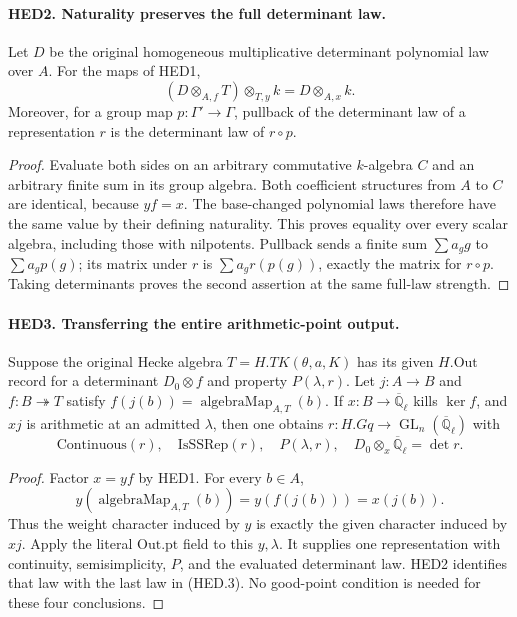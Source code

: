 \documentclass[11pt,a4paper]{article}
\numberwithin{equation}{section}
\theoremstyle{remark}\newtheorem{remark}[theorem]{Remark}
\begin{document}
\paragraph{HED2. Naturality preserves the full determinant law.}
\label{claim:HED2}
Let \(D\) be the original homogeneous multiplicative determinant
polynomial law over \(A\).  For the maps of HED1,
\[
                  (D\otimes_{A,f}T)\otimes_{T,y}k
                              =D\otimes_{A,x}k.
 \tag{HED.2}
\]
Moreover, for a group map \(p:\Gamma'\to\Gamma\), pullback of the
determinant law of a representation \(r\) is the determinant law of
\(r\circ p\).
\begin{proof}
Evaluate both sides on an arbitrary commutative \(k\)-algebra \(C\)
and an arbitrary finite sum in its group algebra.  Both coefficient
structures from \(A\) to \(C\) are identical, because \(yf=x\).
The base-changed polynomial laws therefore have the same value by
their defining naturality.  This proves equality over every scalar
algebra, including those with nilpotents.  Pullback sends a finite sum
\(\sum a_g g\) to \(\sum a_g p(g)\); its matrix under \(r\) is
\(\sum a_g r(p(g))\), exactly the matrix for \(r\circ p\).
Taking determinants proves the second assertion at the same full-law
strength.
\end{proof}

\paragraph{HED3. Transferring the entire arithmetic-point output.}
\label{claim:HED3}
Suppose the original Hecke algebra \(T=H.TK(\theta,a,K)\) has its
given \(H.\mathrm{Out}\) record for a determinant \(D_0\otimes f\)
and property \(P(\lambda,r)\).  Let \(j:A\to B\) and
\(f:B\twoheadrightarrow T\) satisfy
\(f(j(b))=\operatorname{algebraMap}_{A,T}(b)\).
If \(x:B\to\overline{\mathbb Q}_\ell\) kills \(\ker f\), and
\(xj\) is arithmetic at an admitted \(\lambda\), then one obtains
\(r:H.Gq\to\operatorname{GL}_n(\overline{\mathbb Q}_\ell)\) with
\[
 \mathrm{Continuous}(r),\quad \mathrm{IsSSRep}(r),\quad
 P(\lambda,r),\quad D_0\otimes_x\overline{\mathbb Q}_\ell=\det r.
 \tag{HED.3}
\]
\begin{proof}
Factor \(x=yf\) by HED1.  For every \(b\in A\),
\[
 y(\operatorname{algebraMap}_{A,T}(b))=y(f(j(b)))=x(j(b)).
\]
Thus the weight character induced by \(y\) is exactly the given
character induced by \(xj\).  Apply the literal \(\mathrm{Out.pt}\)
field to this \(y,\lambda\).  It supplies one representation with
continuity, semisimplicity, \(P\), and the evaluated determinant law.
HED2 identifies that law with the last law in (HED.3).
No good-point condition is needed for these four conclusions.
\end{proof}
\end{document}
